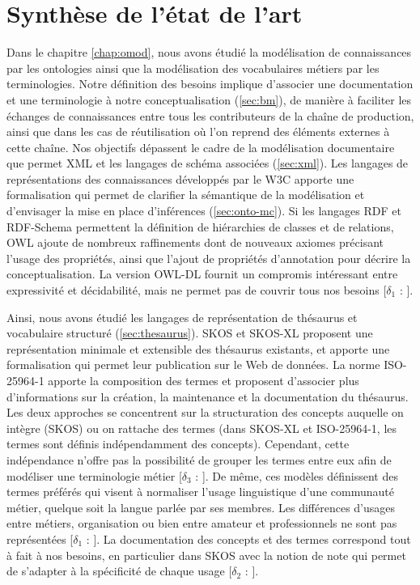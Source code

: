 \section{Synthèse de l'état de l'art}\label{sec:synthese}
Dans le chapitre \ref{chap:omod}, nous avons étudié la modélisation de connaissances par les ontologies ainsi que la modélisation des vocabulaires métiers par les terminologies. 
Notre définition des besoins implique d'associer une documentation et une terminologie à notre conceptualisation (\ref{sec:bm}), de manière à faciliter les échanges de connaissances entre tous les contributeurs de la chaîne de production, ainsi que dans les cas de réutilisation où l'on reprend des éléments externes à cette chaîne.
Nos objectifs dépassent le cadre de la modélisation documentaire que permet XML et les langages de schéma associées (\ref{sec:xml}).
Les langages de représentations des connaissances développés par le W3C apporte une formalisation qui permet de clarifier la sémantique de la modélisation et d'envisager la mise en place d'inférences (\ref{sec:onto-mc}).
Si les langages RDF et RDF-Schema permettent la définition de hiérarchies de classes et de relations, OWL ajoute de nombreux raffinements dont de nouveaux axiomes précisant l'usage des propriétés, ainsi que l'ajout de propriétés d'annotation pour décrire la conceptualisation.
La version OWL-DL fournit un compromis intéressant entre expressivité et décidabilité, mais ne permet pas de couvrir tous nos besoins [$\delta_1$ : ].

Ainsi, nous avons étudié les langages de représentation de thésaurus et vocabulaire structuré (\ref{sec:thesaurus}).
SKOS et SKOS-XL proposent une représentation minimale et extensible des thésaurus existants, et apporte une formalisation qui permet leur publication sur le Web de données.
La norme ISO-25964-1 apporte la composition des termes et proposent d'associer plus d'informations sur la création, la maintenance et la documentation du thésaurus.
Les deux approches se concentrent sur la structuration des concepts auquelle on intègre (SKOS) ou on rattache des termes (dans SKOS-XL et ISO-25964-1, les termes sont définis indépendamment des concepts). 
Cependant, cette indépendance n'offre pas la possibilité de grouper les termes entre eux afin de modéliser une terminologie métier [$\delta_3$ : ]. 
De même, ces modèles définissent des termes préférés qui visent à normaliser l'usage linguistique d'une communauté métier, quelque soit la langue parlée par ses membres.
Les différences d'usages entre métiers, organisation ou bien entre amateur et professionnels ne sont pas représentées [$\delta_1$ : ]. 
La documentation des concepts et des termes correspond tout à fait à nos besoins, en particulier dans SKOS avec la notion de note qui permet de s'adapter à la spécificité de chaque usage [$\delta_2$ : ].\\



